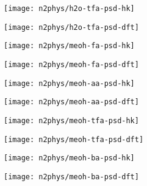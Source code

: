 \begin{figure}[!h]
    \begin{subfigure}{0.25\linewidth}
        \texttt{[image: n2phys/h2o-tfa-psd-hk]}%
        \label{appx:def:fgr:psd-h2o-tfa-hk}
    \end{subfigure}%
    \begin{subfigure}{0.25\linewidth}
        \texttt{[image: n2phys/h2o-tfa-psd-dft]}%
        \label{appx:def:fgr:psd-h2o-tfa-dft}
    \end{subfigure}%
\end{figure}

\pagebreak
\begin{figure}[!h]\ContinuedFloat{}
    \centering
    
    \begin{subfigure}{0.25\linewidth}
        \texttt{[image: n2phys/meoh-fa-psd-hk]}%
        \label{appx:def:fgr:psd-meoh-fa-hk}
    \end{subfigure}%
    \begin{subfigure}{0.25\linewidth}
        \texttt{[image: n2phys/meoh-fa-psd-dft]}%
        \label{appx:def:fgr:psd-meoh-fa-dft}
    \end{subfigure}%
    \begin{subfigure}{0.25\linewidth}
        \texttt{[image: n2phys/meoh-aa-psd-hk]}%
        \label{appx:def:fgr:psd-meoh-aa-hk}
    \end{subfigure}%
    \begin{subfigure}{0.25\linewidth}
        \texttt{[image: n2phys/meoh-aa-psd-dft]}%
        \label{appx:def:fgr:psd-meoh-aa-dft}
    \end{subfigure}%

    \begin{subfigure}{0.25\linewidth}
        \texttt{[image: n2phys/meoh-tfa-psd-hk]}%
        \label{appx:def:fgr:psd-meoh-tfa-hk}
    \end{subfigure}%
    \begin{subfigure}{0.25\linewidth}
        \texttt{[image: n2phys/meoh-tfa-psd-dft]}%
        \label{appx:def:fgr:psd-meoh-tfa-dft}
    \end{subfigure}%
    \begin{subfigure}{0.25\linewidth}
        \texttt{[image: n2phys/meoh-ba-psd-hk]}%
        \label{appx:def:fgr:psd-meoh-ba-hk}
    \end{subfigure}%
    \begin{subfigure}{0.25\linewidth}
        \texttt{[image: n2phys/meoh-ba-psd-dft]}%
        \label{appx:def:fgr:psd-meoh-ba-dft}
    \end{subfigure}%
    

\end{figure}
